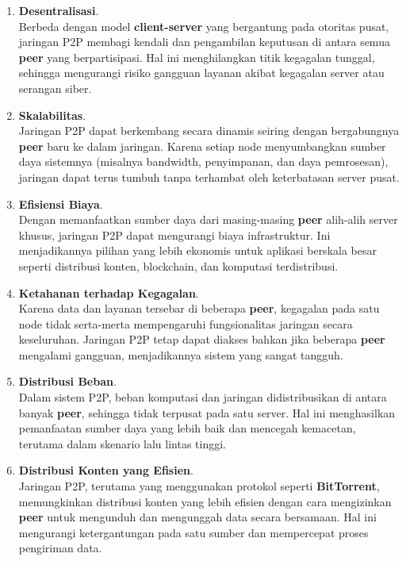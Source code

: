 \begin{enumerate}
	\item \textbf{Desentralisasi}. \\
	Berbeda dengan model \textbf{client-server} yang bergantung pada otoritas pusat, jaringan P2P membagi kendali dan pengambilan keputusan di antara semua \textbf{peer} yang berpartisipasi. Hal ini menghilangkan titik kegagalan tunggal, sehingga mengurangi risiko gangguan layanan akibat kegagalan server atau serangan siber.
	
	\item \textbf{Skalabilitas}. \\
	Jaringan P2P dapat berkembang secara dinamis seiring dengan bergabungnya \textbf{peer} baru ke dalam jaringan. Karena setiap node menyumbangkan sumber daya sistemnya (misalnya bandwidth, penyimpanan, dan daya pemrosesan), jaringan dapat terus tumbuh tanpa terhambat oleh keterbatasan server pusat.
	
	\item \textbf{Efisiensi Biaya}. \\
	Dengan memanfaatkan sumber daya dari masing-masing \textbf{peer} alih-alih server khusus, jaringan P2P dapat mengurangi biaya infrastruktur. Ini menjadikannya pilihan yang lebih ekonomis untuk aplikasi berskala besar seperti distribusi konten, blockchain, dan komputasi terdistribusi.
	
	\item \textbf{Ketahanan terhadap Kegagalan}. \\
	Karena data dan layanan tersebar di beberapa \textbf{peer}, kegagalan pada satu node tidak serta-merta mempengaruhi fungsionalitas jaringan secara keseluruhan. Jaringan P2P tetap dapat diakses bahkan jika beberapa \textbf{peer} mengalami gangguan, menjadikannya sistem yang sangat tangguh.
	
	\item \textbf{Distribusi Beban}. \\
	Dalam sistem P2P, beban komputasi dan jaringan didistribusikan di antara banyak \textbf{peer}, sehingga tidak terpusat pada satu server. Hal ini menghasilkan pemanfaatan sumber daya yang lebih baik dan mencegah kemacetan, terutama dalam skenario lalu lintas tinggi.
	
	\item \textbf{Distribusi Konten yang Efisien}. \\
	Jaringan P2P, terutama yang menggunakan protokol seperti \textbf{BitTorrent}, memungkinkan distribusi konten yang lebih efisien dengan cara mengizinkan \textbf{peer} untuk mengunduh dan mengunggah data secara bersamaan. Hal ini mengurangi ketergantungan pada satu sumber dan mempercepat proses pengiriman data.
	

\end{enumerate}
